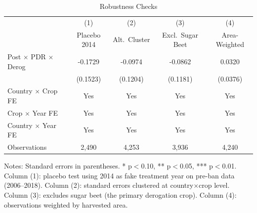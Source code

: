 \begin{table}[H]
\centering
\caption{Robustness Checks}
\label{tab:robust}
\begin{threeparttable}
\begin{tabular}{lcccc}
\toprule
 & (1) & (2) & (3) & (4) \\
 & Placebo 2014 & Alt.\ Cluster & Excl.\ Sugar Beet & Area-Weighted \\
\midrule
Post $\times$ PDR $\times$ Derog & -0.1729 & -0.0974 & -0.0862 & 0.0320 \\
 & (0.1523) & (0.1204) & (0.1181) & (0.0376) \\
\midrule
Country $\times$ Crop FE & Yes & Yes & Yes & Yes \\
Crop $\times$ Year FE & Yes & Yes & Yes & Yes \\
Country $\times$ Year FE & Yes & Yes & Yes & Yes \\
Observations & 2,490 & 4,253 & 3,936 & 4,240 \\
\bottomrule
\end{tabular}
\begin{tablenotes}[flushleft]
\small
\item Notes: Standard errors in parentheses. * p$<$0.10, ** p$<$0.05, *** p$<$0.01. Column (1): placebo test using 2014 as fake treatment year on pre-ban data (2006--2018). Column (2): standard errors clustered at country$\times$crop level. Column (3): excludes sugar beet (the primary derogation crop). Column (4): observations weighted by harvested area.
\end{tablenotes}
\end{threeparttable}
\end{table}
